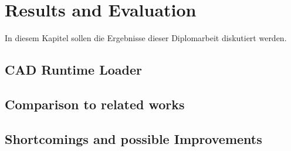 \chapter{Results and Evaluation}
In diesem Kapitel sollen die Ergebnisse dieser Diplomarbeit diskutiert werden. 
\section{CAD Runtime Loader}

\section{Comparison to related works}

\section{Shortcomings and possible Improvements}